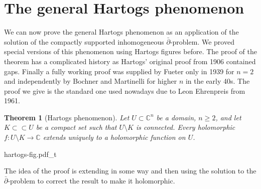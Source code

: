 \documentclass[12pt,openany]{book}
\newcommand{\C}{{\mathbb{C}}}
\theoremstyle{plain}
\newtheorem{thm}{Theorem}[section]
\theoremstyle{remark}
\theoremstyle{definition}
\newenvironment{myfig}{%
    \begin{center}
}{%
    \end{center}
}
\theoremstyle{exercise}
\theoremstyle{example}
\begin{document}

\section{The general Hartogs phenomenon}

We can now prove the general Hartogs phenomenon as an application of the
solution of the compactly supported
inhomogeneous $\bar{\partial}$-problem.  We proved special
versions of this phenomenon using Hartogs figures before.
The proof of the theorem has a complicated history as
Hartogs' original proof from 1906 contained gaps.
Finally a fully working proof was supplied by Fueter only in 1939 for $n=2$
and independently by Bochner and Martinelli for higher $n$
in the early 40s. 
The proof we give is the
standard one used nowadays due to Leon Ehrenpreis from 1961.

\begin{thm}[Hartogs phenomenon]
Let $U \subset \C^n$ be a domain, $n \geq 2$, and let
$K \subset \subset U$ be a compact set such that
$U \setminus K$ is connected.  Every holomorphic $f \colon U \setminus K \to \C$
extends uniquely to a holomorphic function on $U$.
\end{thm}

\begin{myfig}
{hartogs-fig.pdf_t}
\end{myfig}

The idea of the proof is extending in some way and then using the solution
to the $\bar{\partial}$-problem to correct the result to make it
holomorphic.
\end{document}
